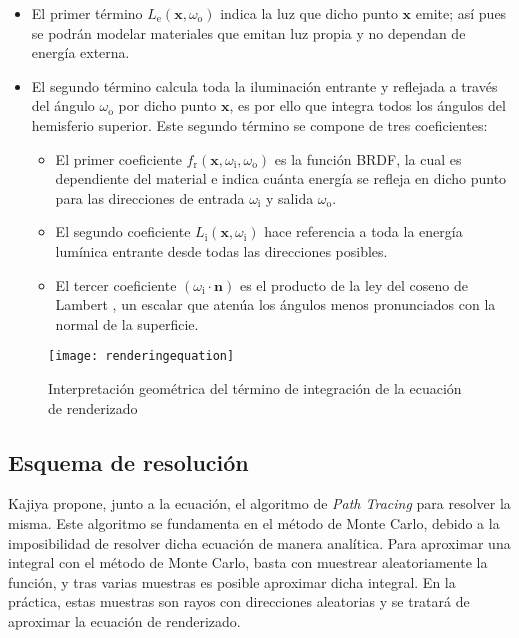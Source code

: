 \begin{itemize}

\item El primer término $L_{\text{e}}(\mathbf {x} ,\omega _{\text{o}})$ indica la luz que dicho punto $\mathbf {x}$ emite; así pues se podrán modelar materiales que emitan luz propia y no dependan de energía externa.

\item El segundo término calcula toda la iluminación entrante y reflejada a través del ángulo $\omega _{\text{o}}$ por dicho punto $\mathbf {x}$, es por ello que integra todos los ángulos del hemisferio superior. Este segundo término se compone de tres coeficientes:

\begin{itemize}

\item El primer coeficiente $f_{\text{r}}(\mathbf {x} ,\omega _{\text{i}},\omega _{\text{o}})$ es la función BRDF, la cual es dependiente del material e indica cuánta energía se refleja en dicho punto para las direcciones de entrada $\omega _{\text{i}}$ y salida $\omega _{\text{o}}$.

\item El segundo coeficiente $L_{\text{i}}(\mathbf {x} ,\omega _{\text{i}})$ hace referencia a toda la energía lumínica entrante desde todas las direcciones posibles.

\item El tercer coeficiente $(\omega _{\text{i}}\cdot \mathbf {n})$ es el producto de la ley del coseno de Lambert \cite{lambert1760jh}, un escalar que atenúa los ángulos menos pronunciados con la normal de la superficie.

\end{itemize}
\end{itemize}

\begin{figure}[H]
    \centering
	\texttt{[image: renderingequation]}
	\caption{Interpretación geométrica del término de integración de la ecuación de renderizado}
	\label{fig:renderingequation}
\end{figure}


	\subsection{Esquema de resolución}
	\label{subsec:montecarlo}
Kajiya \cite{kajiya1986rendering} propone, junto a la ecuación, el algoritmo de \emph{Path Tracing} para resolver la misma. Este algoritmo se fundamenta en el método de Monte Carlo, debido a la imposibilidad de resolver dicha ecuación de manera analítica.
Para aproximar una integral con el método de Monte Carlo, basta con muestrear aleatoriamente la función, y tras varias muestras es posible aproximar dicha integral. En la práctica, estas muestras son rayos con direcciones aleatorias y se tratará de aproximar la ecuación de renderizado. 

